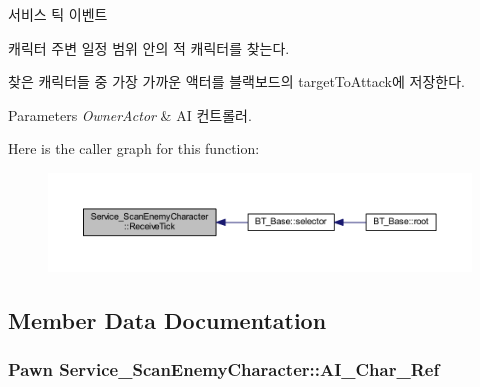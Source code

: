 서비스 틱 이벤트 

캐릭터 주변 일정 범위 안의 적 캐릭터를 찾는다.

찾은 캐릭터들 중 가장 가까운 액터를 블랙보드의 target\+To\+Attack에 저장한다. 
\begin{DoxyParams}{Parameters}
{\em Owner\+Actor} & AI 컨트롤러. \\
\hline
\end{DoxyParams}


Here is the caller graph for this function\+:\nopagebreak
\begin{figure}[H]
\begin{center}
\leavevmode
\includegraphics[width=350pt]{class_service___scan_enemy_character_a66151b657f1393da679331e72c10336f_icgraph}
\end{center}
\end{figure}




\subsection{Member Data Documentation}
\subsubsection[{\texorpdfstring{A\+I\+\_\+\+Char\+\_\+\+Ref}{AI_Char_Ref}}]{\setlength{\rightskip}{0pt plus 5cm}Pawn Service\+\_\+\+Scan\+Enemy\+Character\+::\+A\+I\+\_\+\+Char\+\_\+\+Ref\hspace{0.3cm}{\ttfamily [private]}}\hypertarget{class_service___scan_enemy_character_a74d7b226cb90283b97be427527df818c}{}\label{class_service___scan_enemy_character_a74d7b226cb90283b97be427527df818c}
